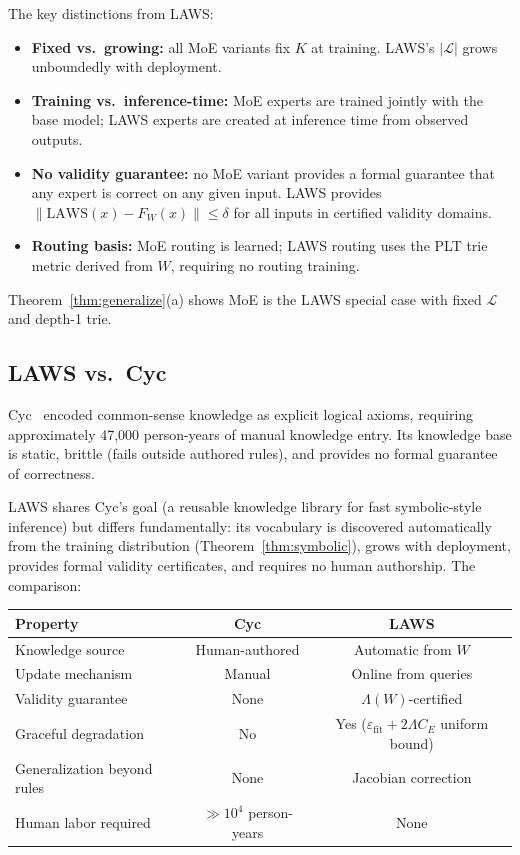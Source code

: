\documentclass[11pt]{article}
\begin{document}
The key distinctions from LAWS:
\begin{itemize}[leftmargin=2em]
  \item \textbf{Fixed vs.\ growing:} all MoE variants fix $K$ at training.
        LAWS's $|\mathcal{L}|$ grows unboundedly with deployment.
  \item \textbf{Training vs.\ inference-time:} MoE experts are trained jointly
        with the base model; LAWS experts are created at inference time from
        observed outputs.
  \item \textbf{No validity guarantee:} no MoE variant provides a formal
        guarantee that any expert is correct on any given input.  LAWS
        provides $\|\mathrm{LAWS}(x) - F_W(x)\| \leq \delta$ for all
        inputs in certified validity domains.
  \item \textbf{Routing basis:} MoE routing is learned; LAWS routing uses
        the PLT trie metric derived from $W$, requiring no routing training.
\end{itemize}

Theorem~\ref{thm:generalize}(a) shows MoE is the LAWS special case with
fixed $\mathcal{L}$ and depth-1 trie.

\subsection{LAWS vs.\ Cyc}

Cyc~\cite{lenat1995} encoded common-sense knowledge as explicit logical axioms,
requiring approximately 47,000 person-years of manual knowledge entry.  Its
knowledge base is static, brittle (fails outside authored rules), and provides
no formal guarantee of correctness.

LAWS shares Cyc's goal (a reusable knowledge library for fast symbolic-style
inference) but differs fundamentally: its vocabulary is discovered automatically
from the training distribution (Theorem~\ref{thm:symbolic}), grows with
deployment, provides formal validity certificates, and requires no human
authorship.  The comparison:

\begin{center}
\begin{tabular}{lcc}
\toprule
Property & Cyc & LAWS \\
\midrule
Knowledge source & Human-authored & Automatic from $W$ \\
Update mechanism & Manual & Online from queries \\
Validity guarantee & None & $\Lambda(W)$-certified \\
Graceful degradation & No & Yes ($\varepsilon_{\mathrm{fit}} + 2\Lambda C_E$ uniform bound) \\
Generalization beyond rules & None & Jacobian correction \\
Human labor required & $\gg 10^4$ person-years & None \\
\bottomrule
\end{tabular}
\end{center}
\end{document}
